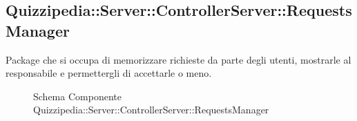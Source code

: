 \subsection{Quizzipedia::Server::ControllerServer::RequestsManager}
Package che si occupa di memorizzare richieste da parte degli utenti, mostrarle al responsabile e permettergli di accettarle o meno.
\begin{figure}[H]
\centering
\noindent{}
\caption[Quizzipedia::Server::ControllerServer::RequestsManager]{Schema Componente Quizzipedia::Server::ControllerServer::RequestsManager}
\end{figure}

